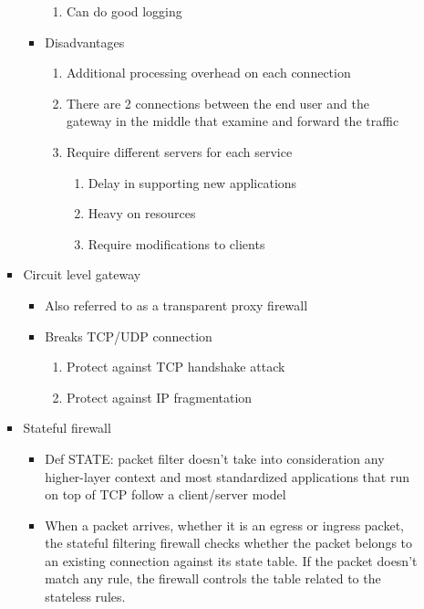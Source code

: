 \documentclass{article}
\begin{document}
\begin{itemize}
\begin{itemize}
\begin{itemize}
\begin{itemize}
\begin{enumerate}
                  \item Can do good logging
                \end{enumerate}
              \item Disadvantages
                \begin{enumerate}
                  \item Additional processing overhead on each connection
                  \item There are 2 connections between the end user and the gateway in the middle that examine and forward the traffic
                  \item Require different servers for each service
                    \begin{enumerate}
                      \item Delay in supporting new applications
                      \item Heavy on resources
                      \item Require modifications to clients
                    \end{enumerate}
                \end{enumerate}
            \end{itemize}
          \item Circuit level gateway
            \begin{itemize}
              \item Also referred to as a transparent proxy firewall
              \item Breaks TCP/UDP connection
                \begin{enumerate}
                  \item Protect against TCP handshake attack
                  \item Protect against IP fragmentation
                \end{enumerate}
            \end{itemize}
          \item Stateful firewall
            \begin{itemize}
              \item Def STATE: packet filter doesn’t take into consideration any higher-layer context and most standardized applications that run on top of TCP follow a client/server model
              \item When a packet arrives, whether it is an egress or ingress packet, the stateful filtering firewall checks whether the packet belongs to an existing connection against its state table. If the packet doesn’t match any rule, the firewall controls the table related to the stateless rules.
              

\end{itemize}
\end{itemize}
\end{itemize}
\end{itemize}
\end{document}

